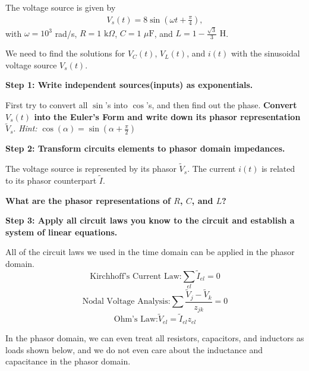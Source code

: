 The voltage source is given by
\begin{align}
V_s(t) = 8 \sin(\omega t + \frac{\pi}{4}),
\end{align}
with $\omega = 10^3$ rad/s, $R = 1$ $\text{k}\Omega$, $C = 1$ $\mu\text{F}$, and $L = 1-\frac{\sqrt{3}}{3}$ $\text{H}$.

We need to find the solutions for $V_C(t)$, $V_L(t)$, and $i(t)$ with the sinusoidal voltage source $V_s(t)$.

\begin{enumerate}

\qitem
\textbf{Step 1: Write independent sources(inputs) as exponentials.}

First try to convert all $\sin$'s into $\cos$'s, and then find out the phase.
\textbf{Convert $V_s(t)$ into the Euler's Form and write down its phasor representation $\widetilde{V}_s$}. \textit{Hint:} $\cos(\alpha)=\sin(\alpha+\frac{\pi}{2})$

\ws{\vspace{100px}}


\qitem \textbf{Step 2: Transform circuits elements to phasor domain impedances.}

The voltage source is represented by its phasor $\widetilde{V}_s$.
The current $i(t)$ is related to its phasor counterpart $\widetilde{I}$. 

\textbf{What are the phasor representations of $R$, $C$, and $L$?}

\ws{\vspace{80px}}


\qitem \textbf{Step 3: Apply all circuit laws you know to the circuit and establish a system of linear equations.}

All of the circuit laws we used in the time domain can be applied in the phasor domain.
$$\text{Kirchhoff's Current Law:} \sum_{el}\widetilde{I}_{el}=0$$
$$\text{Nodal Voltage Analysis:} \sum\frac{\widetilde{V}_j-\widetilde{V}_k}{z_{jk}}=0$$
$$\text{Ohm's Law:} \widetilde{V}_{el}=\widetilde{I}_{el}z_{el}$$

In the phasor domain, we can even treat all resistors, capacitors, and inductors as loads shown below, and
we do not even care about the inductance and capacitance in the phasor domain. 


\end{enumerate}
